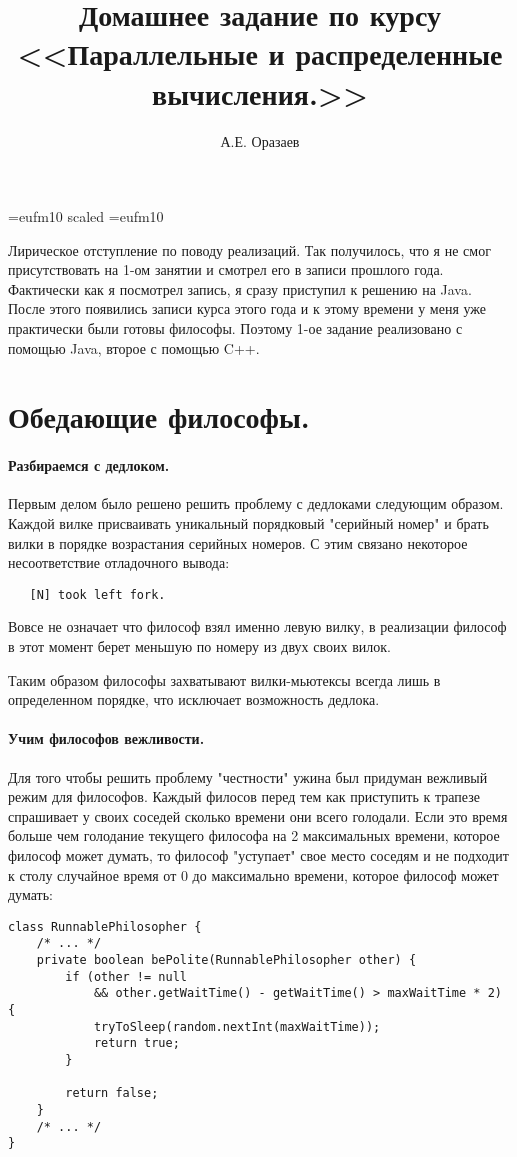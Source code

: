 \documentclass[12pt]{article}
\title{\bf Домашнее задание по курсу \\ <<Параллельные
и распределенные вычисления.>>}
\author{А.Е. Оразаев}
\date{}
\begin{document}
\voffset=-20mm
\hoffset=-12mm
\font\Got=eufm10 scaled \font\Got=eufm10

\maketitle

Лирическое отступление по поводу реализаций. Так получилось,
что я не смог присутствовать на 1-ом занятии и смотрел его в записи
прошлого года. Фактически как я посмотрел запись, я сразу приступил к
решению на Java. После этого появились записи курса этого года и к этому
времени у меня уже практически были готовы философы. Поэтому 1-ое задание
реализовано с помощью Java, второе с помощью C++.

\section{Обедающие философы.}
\paragraph{Разбираемся с дедлоком.} 
Первым делом было решено решить проблему с дедлоками следующим образом.
Каждой вилке присваивать уникальный порядковый "серийный номер" и брать
вилки в порядке возрастания серийных номеров. С этим связано некоторое
несоответствие отладочного вывода: 

\begin{verbatim}
   [N] took left fork.
\end{verbatim}

Вовсе не означает что философ взял именно левую вилку, в реализации
философ в этот момент берет меньшую по номеру из двух своих вилок.

Таким образом философы захватывают вилки-мьютексы всегда лишь в определенном
порядке, что исключает возможность дедлока.

\paragraph{Учим философов вежливости.}
Для того чтобы решить проблему "честности" ужина был придуман вежливый
режим для философов. Каждый филосов перед тем как приступить к трапезе
спрашивает у своих соседей сколько времени они всего голодали. Если это
время больше чем голодание текущего философа на 2 максимальных времени,
которое философ может думать, то философ "уступает" свое место соседям и
не подходит к столу случайное время от 0 до максимально времени, которое
философ может думать:
\begin{verbatim}
class RunnablePhilosopher {
    /* ... */
    private boolean bePolite(RunnablePhilosopher other) {
        if (other != null
            && other.getWaitTime() - getWaitTime() > maxWaitTime * 2) {
            tryToSleep(random.nextInt(maxWaitTime));
            return true;
        }

        return false;
    }
    /* ... */
}
\end{verbatim}
\end{document}
